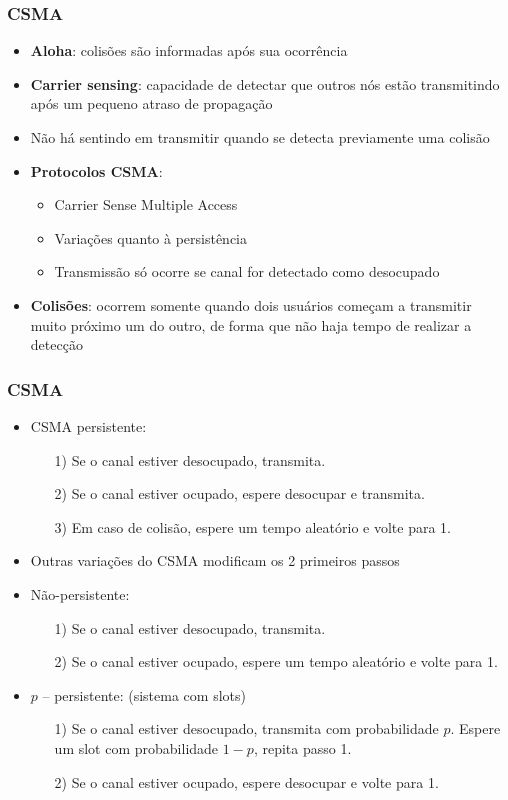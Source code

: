 \begin{frame}
	\frametitle{CSMA}
	
	\begin{itemize}
		\item \textbf{Aloha}: colisões são informadas após sua ocorrência
		\item \textbf{Carrier sensing}: capacidade de detectar que outros nós estão transmitindo após um pequeno atraso de propagação
		\item Não há sentindo em transmitir quando se detecta previamente uma colisão
		\item \textbf{Protocolos CSMA}:
		\begin{itemize}
		    \item Carrier Sense Multiple Access
		    \item Variações quanto à persistência
		    \item Transmissão só ocorre se canal for detectado como desocupado
		\end{itemize}
		\item \textbf{Colisões}: ocorrem somente quando dois usuários começam a transmitir muito próximo um do outro, de forma que não haja tempo de realizar a detecção
	\end{itemize}
	
\end{frame}

\begin{frame}
	\frametitle{CSMA}
	
	\begin{itemize}
		\setlength{\leftmarginii}{0.8cm}
		\item CSMA persistente:		
		\begin{itemize}		    
		    \item[1)] Se o canal estiver desocupado, transmita.
		    \item[2)] Se o canal estiver ocupado, espere desocupar e transmita.
		    \item[3)] Em caso de colisão, espere um tempo aleatório e volte para 1.
		\end{itemize}
		\item Outras variações do CSMA modificam os 2 primeiros passos
		\item Não-persistente:
		\begin{itemize}
		    \item[1)] Se o canal estiver desocupado, transmita.
		    \item[2)] Se o canal estiver ocupado, espere um tempo aleatório e volte para 1.
		\end{itemize}
		\item $p$ – persistente: (sistema com slots)
		\begin{itemize}
		    \item[1)] Se o canal estiver desocupado, transmita com probabilidade $p$. Espere um slot com probabilidade $1 - p$, repita passo 1.
		    \item[2)] Se o canal estiver ocupado, espere desocupar e volte para 1.
		\end{itemize}
	\end{itemize}
	
\end{frame}

